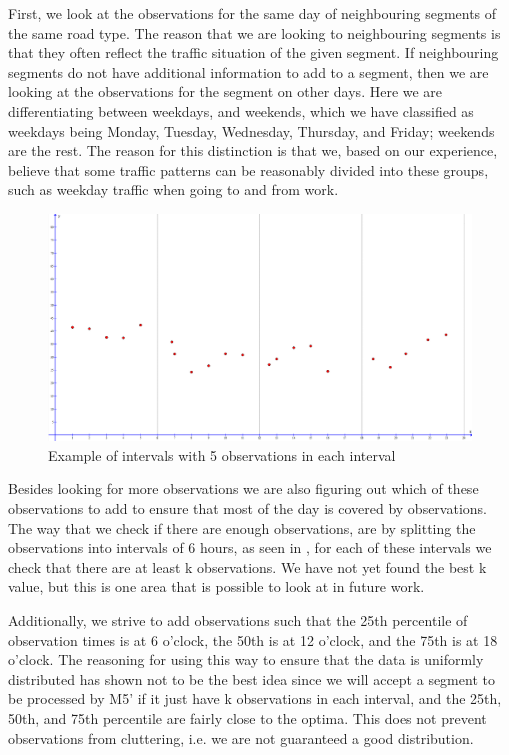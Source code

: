 First, we look at the observations for the same day of neighbouring segments of the same road type. The reason that we are looking to neighbouring segments is that they often reflect the traffic situation of the given segment. If neighbouring segments do not have additional information to add to a segment, then we are looking at the observations for the segment on other days. Here we are differentiating between weekdays, and weekends, which we have classified as weekdays being Monday, Tuesday, Wednesday, Thursday, and Friday; weekends are the rest. The reason for this distinction is that we, based on our experience, believe that some traffic patterns can be reasonably divided into these groups, such as weekday traffic when going to and from work.

\begin{figure}
\centering
\includegraphics[width=\textwidth]{figures/intervals.png}
\caption{Example of intervals with 5 observations in each interval}
\label{fig:intervals}
\end{figure}

Besides looking for more observations we are also figuring out which of these observations to add to ensure that most of the day is covered by observations. The way that we check if there are enough observations, are by splitting the observations into intervals of 6 hours, as seen in , for each of these intervals we check that there are at least k observations. We have not yet found the best k value, but this is one area that is possible to look at in future work.

Additionally, we strive to add observations such that the 25th percentile of observation times is at 6 o'clock, the 50th is at 12 o'clock, and the 75th is at 18 o'clock. The reasoning for using this way to ensure that the data is uniformly distributed has shown not to be the best idea since we will accept a segment to be processed by M5' if it just have k observations in each interval, and the 25th, 50th, and 75th percentile are fairly close to the optima. This does not prevent observations from cluttering, i.e. we are not guaranteed a good distribution.

